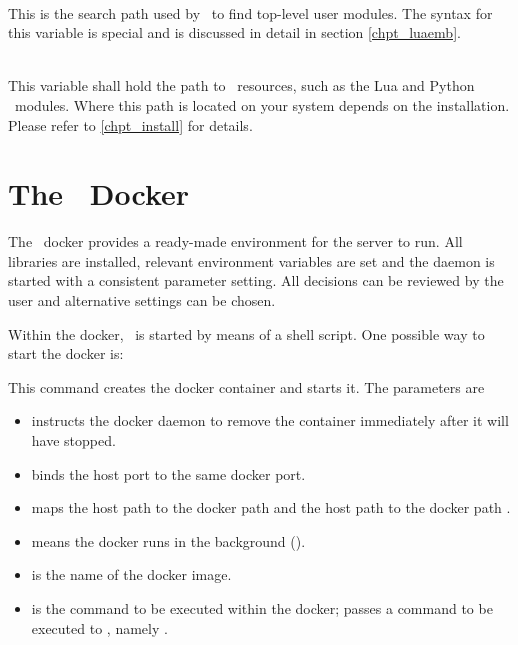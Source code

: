\\
This is the search path used by \nowdb\ to find top-level
user modules. The syntax for this variable is special
and is discussed in detail in section \ref{chpt_luaemb}.

\enlargethispage*{100cm}
\\
This variable shall hold the path to \nowdb\ resources,
such as the Lua and Python \nowdb\ modules. Where this
path is located on your system depends on the installation.
Please refer to \ref{chpt_install} for details.
\clearpage

\section{The \nowdb\ Docker}
The \nowdb\ docker provides a ready-made environment
for the server to run. All libraries are installed,
relevant environment variables are set and the daemon
is started with a consistent parameter setting.
All decisions can be reviewed by the user and alternative
settings can be chosen.

Within the docker, \nowdb\ is started
by means of a shell script.
One possible way to start the docker is:


This command creates the docker container and starts it.
The parameters are
\begin{itemize}
\item {}
instructs the docker daemon to remove
the container immediately after it will have stopped.

\item {} binds the host port 
to the same docker port.

\item {} maps the host path
 to the docker path  and
the host path  to the docker path .

\item {} means the docker runs in the background
().

\item {} is the name of the docker image.

\item {} is the command to be executed
within the docker;  passes a command
to be executed to ,
namely .
\end{itemize}

